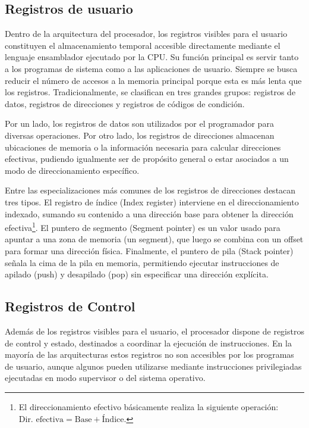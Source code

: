 \subsection{Registros de usuario}

Dentro de la arquitectura del procesador, los registros visibles para el usuario constituyen el almacenamiento temporal accesible directamente mediante el lenguaje ensamblador ejecutado por la CPU. Su función principal es servir tanto a los programas de sistema como a las aplicaciones de usuario. Siempre se busca reducir el número de accesos a la memoria principal porque esta es más lenta que los registros. Tradicionalmente, se clasifican en tres grandes grupos: registros de datos, registros de direcciones y registros de códigos de condición.

Por un lado, los registros de datos son utilizados por el programador para diversas operaciones. Por otro lado, los registros de direcciones almacenan ubicaciones de memoria o la información necesaria para calcular direcciones efectivas, pudiendo igualmente ser de propósito general o estar asociados a un modo de direccionamiento específico.

Entre las especializaciones más comunes de los registros de direcciones destacan tres tipos. El registro de índice (Index register) interviene en el direccionamiento indexado, sumando su contenido a una dirección base para obtener la dirección efectiva\footnote{El direccionamiento efectivo básicamente realiza la siguiente operación: \(\text{Dir. efectiva}=\text{Base}+\text{Índice}\).}. El puntero de segmento (Segment pointer) es un valor usado para apuntar a una zona de memoria (un segment), que luego se combina con un offset para formar una dirección física. Finalmente, el puntero de pila (Stack pointer) señala la cima de la pila en memoria, permitiendo ejecutar instrucciones de apilado (push) y desapilado (pop) sin especificar una dirección explícita.

\subsection{Registros de Control}

Además de los registros visibles para el usuario, el procesador dispone de registros de control y estado, destinados a coordinar la ejecución de instrucciones. En la mayoría de las arquitecturas estos registros no son accesibles por los programas de usuario, aunque algunos pueden utilizarse mediante instrucciones privilegiadas ejecutadas en modo supervisor o del sistema operativo.

